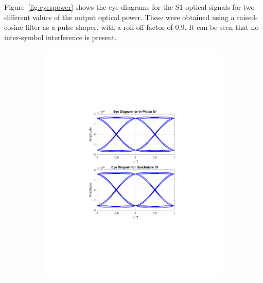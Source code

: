 Figure~\ref{fig:eyespower} shows the eye diagrams for the S1 optical signals
for two different values of the output optical power. These were obtained using
a
raised-cosine filter as a pulse shaper, with a roll-off factor of 0.9. It can
be seen that no inter-symbol interference is present.

\begin{figure}[H]
	\centering
	\begin{subfigure}{.5\textwidth}
		\centering
		\includegraphics[clip, trim=5cm 7cm 5cm 7cm,
			width=\textwidth]{./sdf/m_qam_system/figures/eye120db09ro.pdf}
	\end{subfigure}%
	\begin{subfigure}{.5\textwidth}
		\centering

\end{subfigure}
\end{figure}
